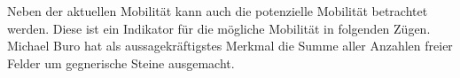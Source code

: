 Neben der aktuellen Mobilität kann auch die potenzielle Mobilität betrachtet werden. Diese ist ein Indikator für die
mögliche Mobilität in folgenden Zügen. Michael Buro hat als aussagekräftigstes Merkmal die Summe aller Anzahlen freier
Felder um gegnerische Steine ausgemacht.
\cite[S. 8f.]{evaluationfunctions}
